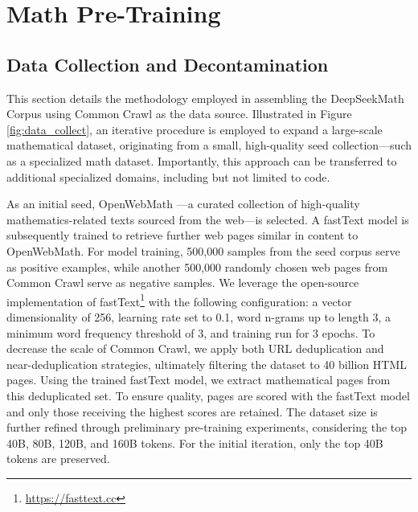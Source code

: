 \section{Math Pre-Training}

\subsection{Data Collection and Decontamination} 
This section details the methodology employed in assembling the DeepSeekMath Corpus using Common Crawl as the data source. Illustrated in Figure \ref{fig:data_collect}, an iterative procedure is employed to expand a large-scale mathematical dataset, originating from a small, high-quality seed collection—such as a specialized math dataset. Importantly, this approach can be transferred to additional specialized domains, including but not limited to code.

As an initial seed, OpenWebMath \citep{openwebmath}—a curated collection of high-quality mathematics-related texts sourced from the web—is selected. A fastText model \citep{joulin2016fasttext} is subsequently trained to retrieve further web pages similar in content to OpenWebMath. For model training, 500,000 samples from the seed corpus serve as positive examples, while another 500,000 randomly chosen web pages from Common Crawl serve as negative samples. We leverage the open-source implementation of fastText\footnote{\url{https://fasttext.cc}} with the following configuration: a vector dimensionality of 256, learning rate set to 0.1, word n-grams up to length 3, a minimum word frequency threshold of 3, and training run for 3 epochs. To decrease the scale of Common Crawl, we apply both URL deduplication and near-deduplication strategies, ultimately filtering the dataset to 40 billion HTML pages. Using the trained fastText model, we extract mathematical pages from this deduplicated set. To ensure quality, pages are scored with the fastText model and only those receiving the highest scores are retained. The dataset size is further refined through preliminary pre-training experiments, considering the top 40B, 80B, 120B, and 160B tokens. For the initial iteration, only the top 40B tokens are preserved.


